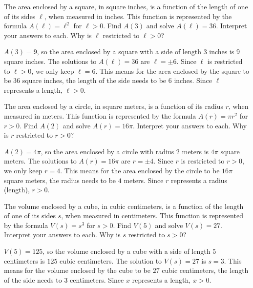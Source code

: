 \documentclass{ximera}
\begin{document}
\begin{problem}
The area enclosed by a square, in square inches,  is a function of the length of one of its sides $\ell$, when measured in inches.  This function is represented by the formula $A(\ell) = \ell^2$ for $\ell > 0$.  Find $A(3)$ and solve $A(\ell) = 36$.  Interpret your answers to each.  Why is $\ell$ restricted to $\ell > 0$?

\begin{solution}
$A(3) = 9$, so the area enclosed by a square with a side of length $3$ inches is $9$ square inches.  The solutions to $A(\ell) = 36$ are $\ell = \pm 6$.  Since $\ell$ is restricted to  $\ell > 0$, we only keep $\ell  = 6$.  This means for the area enclosed by the square to be $36$ square inches, the length of the side needs to be $6$ inches.  Since $\ell$ represents a length, $\ell > 0$.
\end{solution}
\end{problem}

\begin{problem}
The area enclosed by a circle, in square meters, is a function of its radius $r$, when measured in meters.  This function is represented by the formula $A(r) = \pi r^2$ for $r > 0$.  Find $A(2)$ and solve $A(r) = 16\pi$.  Interpret your answers to each.  Why is $r$ restricted to $r > 0$?

\begin{solution}
$A(2) = 4\pi$, so the area enclosed by a circle with radius $2$ meters is $4\pi$ square meters.  The solutions to $A(r) = 16\pi$ are $r = \pm 4$.  Since $r$ is restricted to $r > 0$, we only keep $r = 4$.  This means for the area enclosed by the circle to be $16\pi$ square meters, the radius needs to be $4$ meters.  Since $r$ represents a radius (length), $r > 0$.
\end{solution}
\end{problem}

\begin{problem}
The volume  enclosed by a cube, in cubic centimeters, is a function of the length of one of its sides $s$, when measured in centimeters.   This function is represented by the formula $V(s) = s^3$ for $s > 0$.  Find $V(5)$ and solve $V(s) = 27$.  Interpret your answers to each.  Why is $s$ restricted to $s > 0$?
\begin{solution}
$V(5) = 125$, so the volume enclosed by a cube with a side of length $5$ centimeters is $125$ cubic centimeters.  The solution to $V(s) = 27$ is $s = 3$.  This means for the volume enclosed by the cube to be $27$ cubic centimeters, the length of the side needs to $3$ centimeters.  Since $x$ represents a length, $x > 0$.
\end{solution}
\end{problem}
\end{document}
